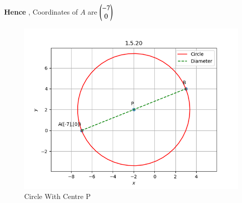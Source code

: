\documentclass[journal]{IEEEtran}
\numberwithin{equation}{enumi}
\numberwithin{figure}{enumi}
\begin{document}
\textbf{Hence} , Coordinates of $A$ are $\myvec{-7\\0}$ 

\begin{figure}[H]
    \centering
    \includegraphics[width=1\linewidth]{figs/circle_graph2.png}
    \caption{Circle With Centre P}
    \label{fig:placeholder_1}
\end{figure}
\end{document}
